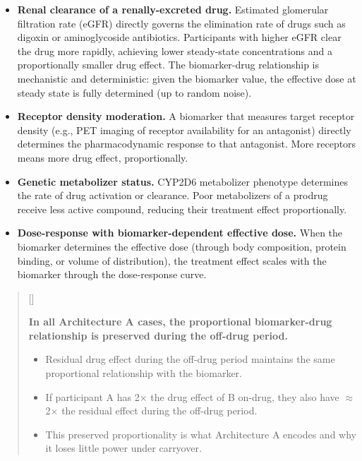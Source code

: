 \documentclass[
  11pt,
]{article}
\newcounter{pgraph}
\newenvironment{bullets}{%
  \stepcounter{pgraph}%
  \begin{quote}\small\sffamily\color[gray]{0.30}%
  {\normalfont\scriptsize\color[gray]{0.58}[\thepgraph]\enspace}}{%
  \end{quote}}
\begin{document}
\begin{itemize}
\item \textbf{Renal clearance of a renally-excreted drug.} Estimated
  glomerular filtration rate (eGFR) directly governs the
  elimination rate of drugs such as digoxin or aminoglycoside
  antibiotics. Participants with higher eGFR clear the drug more
  rapidly, achieving lower steady-state concentrations and a
  proportionally smaller drug effect. The biomarker-drug
  relationship is mechanistic and deterministic: given the
  biomarker value, the effective dose at steady state is fully
  determined (up to random noise).

\item \textbf{Receptor density moderation.} A biomarker that measures
  target receptor density (e.g., PET imaging of receptor
  availability for an antagonist) directly determines the
  pharmacodynamic response to that antagonist. More receptors
  means more drug effect, proportionally.

\item \textbf{Genetic metabolizer status.} CYP2D6 metabolizer phenotype
  determines the rate of drug activation or clearance. Poor
  metabolizers of a prodrug receive less active compound,
  reducing their treatment effect proportionally.

\item \textbf{Dose-response with biomarker-dependent effective dose.}
  When the biomarker determines the effective dose (through
  body composition, protein binding, or volume of distribution),
  the treatment effect scales with the biomarker through the
  dose-response curve.
\end{itemize}

\begin{bullets}

\textbf{In all Architecture A cases, the proportional
biomarker-drug relationship is preserved during the off-drug
period.}

\begin{itemize}\setlength{\itemsep}{2pt}\setlength{\parskip}{0pt}
\item Residual drug effect during the off-drug period maintains the same
  proportional relationship with the biomarker.
\item If participant A has 2$\times$ the drug effect of B
  on-drug, they also have $\approx$2$\times$ the residual
  effect during the off-drug period.
\item This preserved proportionality is what Architecture A
  encodes and why it loses little power under carryover.
\end{itemize}

\end{bullets}
\end{document}
